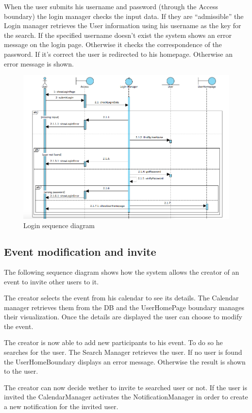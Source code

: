 \documentclass[10pt,a4paper,titlepage]{article}
\begin{document}
When the user submits his username and password (through the Access boundary) the login manager checks the input data. If they are “admissible” the Login manager retrieves the User information using his username as the key for the search. If the specified username doesn’t exist the system shows an error message on the login page. Otherwise it checks the correspondence of the password. If it’s correct the user is redirected to his homepage. Otherwise an error message is shown.
\begin{figure}[h!]
\centering
\includegraphics[width=\linewidth]{./images/Login_sequence}
\caption[login sequence]{Login sequence diagram}
\label{fig:Login_sequence}
\end{figure}

\clearpage
\subsection{Event modification and invite}
The following sequence diagram shows how the system allows the creator of an event to invite other users to it. 

The creator selects the event from his calendar to see its details. The Calendar manager retrieves them from the DB and the UserHomePage boundary manages their visualization. Once the details are displayed the user can choose to modify the event.

The creator is now able to add new participants to his event. To do so he searches for the user. The Search Manager retrieves the user. If no user is found the UserHomeBoundary displays an error message. Otherwise the result is shown to the user.

The creator can now decide wether to invite te searched user or not. If the user is invited the CalendarManager activates the NotificationManager in order to create a new notification for the invited user.
\end{document}
